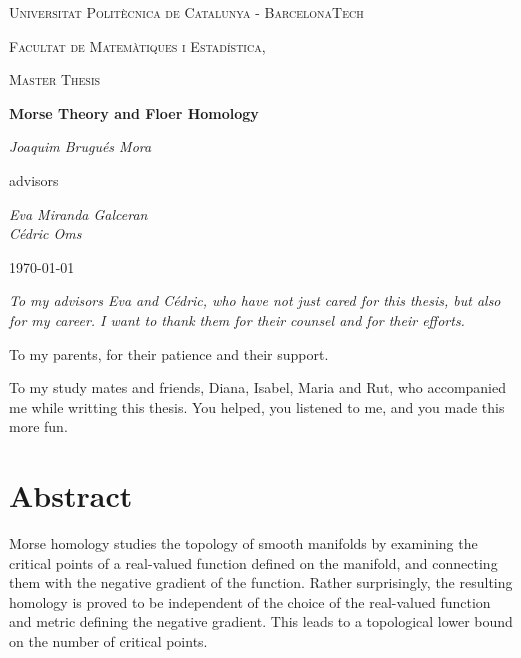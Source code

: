 \documentclass[a4paper,11pt]{book}
\begin{document}


\begin{titlepage}
	\centering
	{\scshape\LARGE Universitat Politècnica de Catalunya - BarcelonaTech\par}
	{\scshape\LARGE Facultat de Matemàtiques i Estadística, \par}
	\vspace{1cm}
	{\scshape\Large Master Thesis\par}
	\vspace{1.5cm}
	{\huge\bfseries Morse Theory and Floer Homology\par}
	\vspace{2cm}
	{\Large\itshape Joaquim Brugués Mora\par}
	\vfill
	advisors\par
	{\Large\itshape Eva Miranda Galceran \\ Cédric Oms \par}

	\vfill

	{\large \today\par}
\end{titlepage}

\cleardoublepage

\begin{flushright}
\it
To my advisors Eva and Cédric, who have not just cared for this thesis, but also for my career. I want to thank them for their counsel and for their efforts.

To my parents, for their patience and their support.

To my study mates and friends, Diana, Isabel, Maria and Rut, who accompanied me while writting this thesis. You helped, you listened to me, and you made this more fun.
\end{flushright}


\chapter*{Abstract}

Morse homology studies the topology of smooth manifolds by examining the critical points of a real-valued function defined on the manifold, and connecting them with the negative gradient of the function. Rather surprisingly, the resulting homology is proved to be independent of the choice of the real-valued function and metric defining the negative gradient. This leads to a topological lower bound on the number of critical points.
\end{document}

